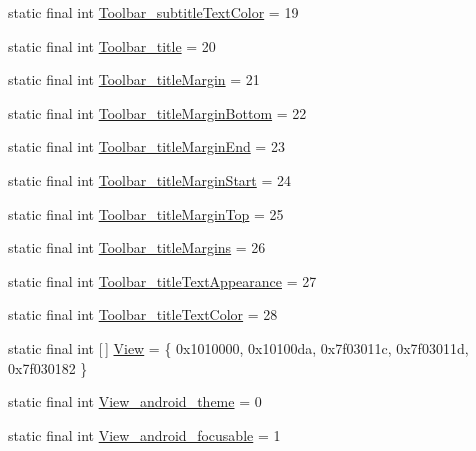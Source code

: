 \begin{DoxyCompactItemize}
\item 
static final int \mbox{\hyperlink{classandroid_1_1support_1_1design_1_1_r_1_1styleable_af80f7c0e024f277f72f31c36c9a8b256}{Toolbar\+\_\+subtitle\+Text\+Color}} = 19
\item 
static final int \mbox{\hyperlink{classandroid_1_1support_1_1design_1_1_r_1_1styleable_a11e8147b2ddb5ab456b7530c9fb3fce2}{Toolbar\+\_\+title}} = 20
\item 
static final int \mbox{\hyperlink{classandroid_1_1support_1_1design_1_1_r_1_1styleable_aeced67b1a8dbb0c5b8d240e3ddeb4bf9}{Toolbar\+\_\+title\+Margin}} = 21
\item 
static final int \mbox{\hyperlink{classandroid_1_1support_1_1design_1_1_r_1_1styleable_a8a74fa3c25fd104e2317f2d59163a0a1}{Toolbar\+\_\+title\+Margin\+Bottom}} = 22
\item 
static final int \mbox{\hyperlink{classandroid_1_1support_1_1design_1_1_r_1_1styleable_a33489940e504cd17320b0791518b1800}{Toolbar\+\_\+title\+Margin\+End}} = 23
\item 
static final int \mbox{\hyperlink{classandroid_1_1support_1_1design_1_1_r_1_1styleable_aaa2847451f4babb9f8453a3ab3f1437b}{Toolbar\+\_\+title\+Margin\+Start}} = 24
\item 
static final int \mbox{\hyperlink{classandroid_1_1support_1_1design_1_1_r_1_1styleable_ab372cb599a5074e8cc57f44c95430812}{Toolbar\+\_\+title\+Margin\+Top}} = 25
\item 
static final int \mbox{\hyperlink{classandroid_1_1support_1_1design_1_1_r_1_1styleable_a7a7c87d2d30eb1c42aba4dc93e811b9f}{Toolbar\+\_\+title\+Margins}} = 26
\item 
static final int \mbox{\hyperlink{classandroid_1_1support_1_1design_1_1_r_1_1styleable_a2cbcc72025cb5da4d094b8250deacd64}{Toolbar\+\_\+title\+Text\+Appearance}} = 27
\item 
static final int \mbox{\hyperlink{classandroid_1_1support_1_1design_1_1_r_1_1styleable_a6cc4632e269ce480a68bcce27c2815d5}{Toolbar\+\_\+title\+Text\+Color}} = 28
\item 
static final int \mbox{[}$\,$\mbox{]} \mbox{\hyperlink{classandroid_1_1support_1_1design_1_1_r_1_1styleable_ae848bcf5b638b9248537d28ebf90c67f}{View}} = \{ 0x1010000, 0x10100da, 0x7f03011c, 0x7f03011d, 0x7f030182 \}
\item 
static final int \mbox{\hyperlink{classandroid_1_1support_1_1design_1_1_r_1_1styleable_a3d64256b1ef377ea472c9b16e3d9ca72}{View\+\_\+android\+\_\+theme}} = 0
\item 
static final int \mbox{\hyperlink{classandroid_1_1support_1_1design_1_1_r_1_1styleable_a011b87eb64cd314c6de1fcb3394fcb1d}{View\+\_\+android\+\_\+focusable}} = 1

\end{DoxyCompactItemize}
